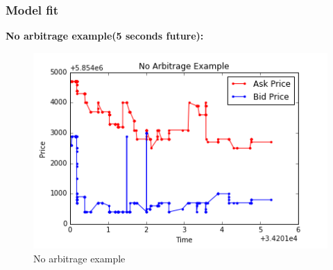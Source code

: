 \documentclass[xcolor={x11names,svgnames,dvipsnames}]{beamer}
\begin{document}
\begin{frame}
\frametitle{Model fit}
\textbf{No arbitrage example(5 seconds future):}
\begin{figure}
\centering
\includegraphics[width=0.7\linewidth]{./no_arbi_example}
\caption{No arbitrage example}
\label{fig:no_arbi_example}
\end{figure}

\end{frame}
\end{document}
